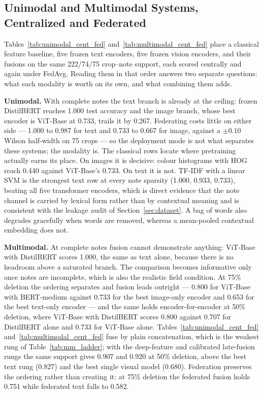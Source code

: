 \subsection{Unimodal and Multimodal Systems, Centralized and Federated}

Tables~\ref{tab:unimodal_cent_fed} and~\ref{tab:multimodal_cent_fed} place a
classical feature baseline, five frozen text encoders, five frozen vision
encoders, and their fusions on the same 222/74/75 crop--note support, each
scored centrally and again under FedAvg. Reading them in that order answers two
separate questions: what each modality is worth on its own, and what combining
them adds.

\textbf{Unimodal.} With complete notes the text branch is already at the
ceiling: frozen DistilBERT reaches 1.000 test accuracy and the image branch,
whose best encoder is ViT-Base at 0.733, trails it by 0.267. Federating costs
little on either side --- 1.000 to 0.987 for text and 0.733 to 0.667 for image,
against a $\pm0.10$ Wilson half-width on 75 crops --- so the deployment mode is
not what separates these systems; the modality is. The classical rows locate
where pretraining actually earns its place. On images it is decisive: colour
histograms with HOG reach 0.440 against ViT-Base's 0.733. On text it is not.
TF-IDF with a linear SVM is the strongest text row at every note sparsity
(1.000, 0.933, 0.733), beating all five transformer encoders, which is direct
evidence that the note channel is carried by lexical form rather than by
contextual meaning and is consistent with the leakage audit of
Section~\ref{sec:dataset}. A bag of words also degrades gracefully when words
are removed, whereas a mean-pooled contextual embedding does not.

\textbf{Multimodal.} At complete notes fusion cannot demonstrate anything:
ViT-Base with DistilBERT scores 1.000, the same as text alone, because there is
no headroom above a saturated branch. The comparison becomes informative only
once notes are incomplete, which is also the realistic field condition. At 75\%
deletion the ordering separates and fusion leads outright --- 0.800 for
ViT-Base with BERT-medium against 0.733 for the best image-only encoder and
0.653 for the best text-only encoder --- and the same holds encoder-for-encoder
at 50\% deletion, where ViT-Base with DistilBERT scores 0.800 against 0.707 for
DistilBERT alone and 0.733 for ViT-Base alone. Tables~\ref{tab:unimodal_cent_fed}
and~\ref{tab:multimodal_cent_fed} fuse by plain concatenation, which is the
weakest rung of Table~\ref{tab:mm_ladder}; with the deep-feature and calibrated
late-fusion rungs the same support gives 0.907 and 0.920 at 50\% deletion,
above the best text rung (0.827) and the best single visual model (0.680).
Federation preserves the ordering rather than creating it: at 75\% deletion the
federated fusion holds 0.751 while federated text falls to 0.582.

